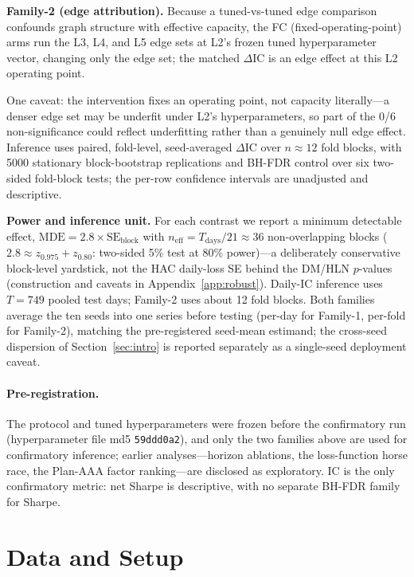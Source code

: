 \documentclass{article}
\begin{document}
\textbf{Family-2 (edge attribution).} Because a tuned-vs-tuned edge comparison confounds graph structure with effective capacity, the FC (fixed-operating-point) arms run the L3, L4, and L5 edge sets at L2's frozen tuned hyperparameter vector, changing only the edge set; the matched $\Delta$IC is an edge effect at this L2 operating point.

One caveat: the intervention fixes an operating point, not capacity literally---a denser edge set may be underfit under L2's hyperparameters, so part of the 0/6 non-significance could reflect underfitting rather than a genuinely null edge effect. Inference uses paired, fold-level, seed-averaged $\Delta$IC over $n\approx12$ fold blocks, with 5000 stationary block-bootstrap replications and BH-FDR control over six two-sided fold-block tests; the per-row confidence intervals are unadjusted and descriptive.

\textbf{Power and inference unit.} For each contrast we report a minimum detectable effect, $\text{MDE}=2.8\times\text{SE}_{\text{block}}$ with $n_{\text{eff}}=T_{\text{days}}/21\approx36$ non-overlapping blocks ($2.8\approx z_{0.975}+z_{0.80}$: two-sided 5\% test at 80\% power)---a deliberately conservative block-level yardstick, not the HAC daily-loss SE behind the DM/HLN $p$-values (construction and caveats in Appendix~\ref{app:robust}). Daily-IC inference uses $T=749$ pooled test days; Family-2 uses about 12 fold blocks. Both families average the ten seeds into one series before testing (per-day for Family-1, per-fold for Family-2), matching the pre-registered seed-mean estimand; the cross-seed dispersion of Section~\ref{sec:intro} is reported separately as a single-seed deployment caveat.

\paragraph{Pre-registration.}
The protocol and tuned hyperparameters were frozen before the confirmatory run (hyperparameter file md5 \texttt{59ddd0a2}), and only the two families above are used for confirmatory inference; earlier analyses---horizon ablations, the loss-function horse race, the Plan-AAA factor ranking---are disclosed as exploratory. IC is the only confirmatory metric: net Sharpe is descriptive, with no separate BH-FDR family for Sharpe.

\section{Data and Setup}\label{sec:data}
\end{document}
